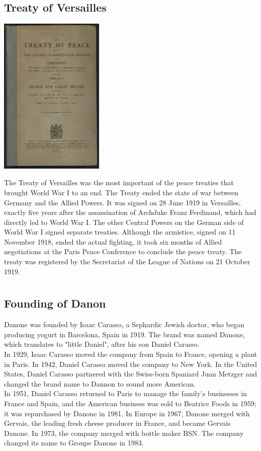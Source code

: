 \documentclass[11pt]{report}
\begin{document}
\subsection{Treaty of Versailles}
\vspace{2mm}\begin{center}\includegraphics[width=5cm]{./img/treatyOfVersailles.jpg}\end{center}
The Treaty of Versailles was the most important of the peace treaties that brought World War I to an end. The Treaty ended the state of war between Germany and the Allied Powers. It was signed on 28 June 1919 in Versailles, exactly five years after the assassination of Archduke Franz Ferdinand, which had directly led to World War I. The other Central Powers on the German side of World War I signed separate treaties. Although the armistice, signed on 11 November 1918, ended the actual fighting, it took six months of Allied negotiations at the Paris Peace Conference to conclude the peace treaty. The treaty was registered by the Secretariat of the League of Nations on 21 October 1919.
\section{}
\subsection{Founding of Danon}
Danone was founded by Isaac Carasso, a Sephardic Jewish doctor, who began producing yogurt in Barcelona, Spain in 1919. The brand was named Danone, which translates to "little Daniel", after his son Daniel Carasso.\\
\indent In 1929, Isaac Carasso moved the company from Spain to France, opening a plant in Paris. In 1942, Daniel Carasso moved the company to New York. In the United States, Daniel Carasso partnered with the Swiss-born Spaniard Juan Metzger and changed the brand name to Dannon to sound more American.\\ \indent In 1951, Daniel Carasso returned to Paris to manage the family's businesses in France and Spain, and the American business was sold to Beatrice Foods in 1959; it was repurchased by Danone in 1981. In Europe in 1967, Danone merged with Gervais, the leading fresh cheese producer in France, and became Gervais Danone. In 1973, the company merged with bottle maker BSN. The company changed its name to Groupe Danone in 1983.
\end{document}
